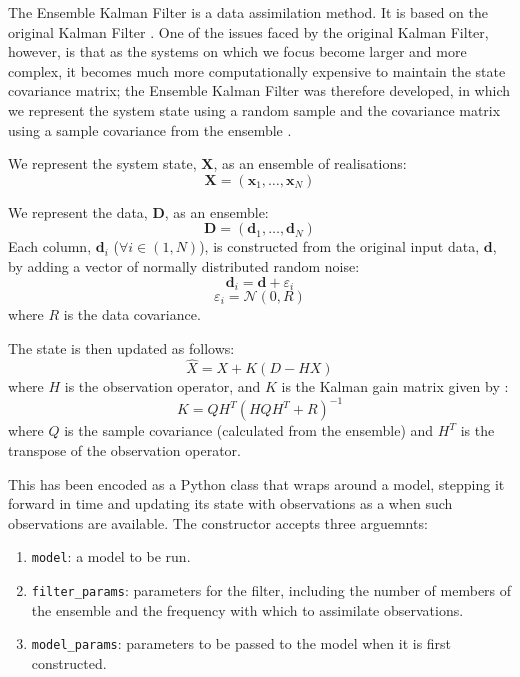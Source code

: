 \documentclass[a4paper, 12pt, twoside]{article}
\begin{document}
The Ensemble Kalman Filter is a data assimilation method.
It is based on the original Kalman Filter \citep{kalman1960new}.
One of the issues faced by the original Kalman Filter, however, is that as the
systems on which we focus become larger and more complex, it becomes much more
computationally expensive to maintain the state covariance matrix; the Ensemble
Kalman Filter was therefore developed, in which we represent the system state
using a random sample and the covariance matrix using a sample covariance from
the ensemble \citep{evensen2003ensemble}.

We represent the system state, $\mathbf{X}$, as an ensemble of realisations:
\begin{equation}
    \mathbf{X} = \left( \mathbf{x}_1, \ldots, \mathbf{x}_N \right)
\end{equation}

We represent the data, $\mathbf{D}$, as an ensemble:
\begin{equation}
    \mathbf{D} = \left( \mathbf{d}_1, \ldots, \mathbf{d}_N \right)
\end{equation}
Each column, $\mathbf{d}_i$ ($\forall i \in (1, N)$), is constructed from the
original input data, $\mathbf{d}$, by adding a vector of normally distributed
random noise:
\begin{equation}
    \mathbf{d}_i = \mathbf{d} + \varepsilon_i
\end{equation}
\begin{equation}
    \varepsilon_i = \mathcal{N} (0, R)
\end{equation}
where $R$ is the data covariance.

The state is then updated as follows:
\begin{equation}
    \hat{X} = X + K \left( D - H X \right)
\end{equation}
where $H$ is the observation operator, and $K$ is the Kalman gain matrix given
by \citep{mandel2009brief}:
\begin{equation}
    K = Q H^T \left( H Q H^T + R \right)^{-1}
\end{equation}
where $Q$ is the sample covariance (calculated from the ensemble) and $H^T$ is
the transpose of the observation operator.

This has been encoded as a Python class that wraps around a model, stepping it
forward in time and updating its state with observations as a when such
observations are available.
The constructor accepts three arguemnts:
\begin{enumerate}
    \item \texttt{model}: a model to be run.
    \item \texttt{filter\_params}: parameters for the filter, including the
        number of members of the ensemble and the frequency with which to
        assimilate observations.
    \item \texttt{model\_params}: parameters to be passed to the model when it
        is first constructed.
\end{enumerate}
\end{document}
